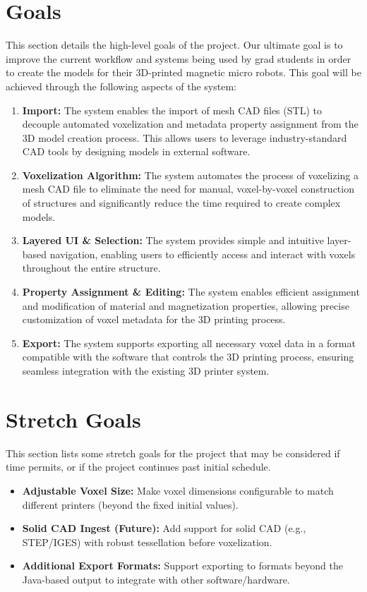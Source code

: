 \documentclass{article}
\begin{document}
\section{Goals}
This section details the high-level goals of the project. Our ultimate goal is to improve the current workflow and systems being used by grad students in order to create the models for their 3D-printed magnetic micro robots. This goal will be achieved through the following aspects of the system:

\begin{enumerate}
  \item \textbf{Import:} The system enables the import of mesh CAD files (STL) to decouple automated voxelization and metadata property assignment from the 3D model creation process. This allows users to leverage industry-standard CAD tools by designing models in external software.
  \item \textbf{Voxelization Algorithm:} The system automates the process of voxelizing a mesh CAD file to eliminate the need for manual, voxel-by-voxel construction of structures and significantly reduce the time required to create complex models.
  \item \textbf{Layered UI \& Selection:} The system provides simple and intuitive layer-based navigation, enabling users to efficiently access and interact with voxels throughout the entire structure.
  \item \textbf{Property Assignment \& Editing:} The system enables efficient assignment and modification of material and magnetization properties, allowing precise customization of voxel metadata for the 3D printing process.
  \item \textbf{Export:} The system supports exporting all necessary voxel data in a format compatible with the software that controls the 3D printing process, ensuring seamless integration with the existing 3D printer system.

\end{enumerate}

\section{Stretch Goals}
This section lists some stretch goals for the project that may be considered if time permits, or if the 
project continues past initial schedule.

\begin{itemize}
  \item \textbf{Adjustable Voxel Size:} Make voxel dimensions configurable to match different printers (beyond the fixed initial values).
  \item \textbf{Solid CAD Ingest (Future):} Add support for solid CAD (e.g., STEP/IGES) with robust tessellation before voxelization.
  \item \textbf{Additional Export Formats:} Support exporting to formats beyond the Java-based output to integrate with other software/hardware.
\end{itemize}
\end{document}
